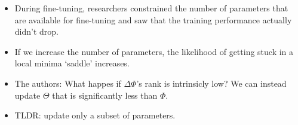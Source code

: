 \documentclass[11pt]{article}
\begin{document}
\begin{minipage}[l]{.5\linewidth}
    \begin{figure}[H]
        \centering
    \end{figure}    
\end{minipage}\hfill
\begin{minipage}[r]{.48\linewidth}
    \begin{itemize}
        \item During fine-tuning, researchers constrained the number of parameters that are available for fine-tuning and saw that the training performance actually didn't drop.
        \item If we increase the number of parameters, the likelihood of getting stuck in a local minima `saddle' increases.
        \item The authors: What happes if $\Delta \Phi$'s rank is intrinsicly low? We can instead update $\Theta$ that is significantly less than $\Phi$.
        \item TLDR: update only a subset of parameters.
    \end{itemize}
\end{minipage}
\end{document}
